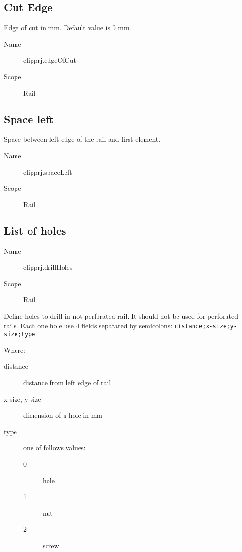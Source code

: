\documentclass[%
	a4paper,
	oneside,
	listof=numbered,
	parskip=half,
	headsepline=true,
	footsepline=false,
	0.7headlines,
	]{scrbook}
\begin{document}
\subsection{Cut Edge}

Edge of cut in mm.
Default value is 0 mm.

\begin{description}
	\item[Name] clipprj.edgeOfCut
	\item[Scope] Rail
\end{description}

\subsection{Space left}

Space between left edge of the rail and first element.

\begin{description}
	\item[Name] clipprj.spaceLeft
	\item[Scope] Rail
\end{description}

\subsection{List of holes}

\begin{description}
	\item[Name] clipprj.drillHoles
	\item[Scope] Rail
\end{description}

Define holes to drill in not perforated rail.
It should not be used for perforated rails.
Each one hole use 4 fields separated by semicolons: \verb|distance;x-size;y-size;type|

Where:

\begin{description}
	\item[distance] distance from left edge of rail
	\item[x-size, y-size] dimension of a hole in mm
	\item[type] one of follows values:
	\begin{description}
		\item[0] hole
		\item[1] nut
		\item[2] screw
	\end{description}
\end{description}
\end{document}
